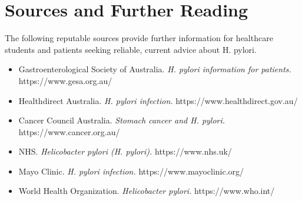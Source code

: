 \section*{Sources and Further Reading}
The following reputable sources provide further information for healthcare students and patients seeking reliable, current advice about H. pylori.

\begin{itemize}
    \item Gastroenterological Society of Australia. \textit{H. pylori information for patients.} https://www.gesa.org.au/
    \item Healthdirect Australia. \textit{H. pylori infection.} https://www.healthdirect.gov.au/
    \item Cancer Council Australia. \textit{Stomach cancer and H. pylori.} https://www.cancer.org.au/
    \item NHS. \textit{Helicobacter pylori (H. pylori).} https://www.nhs.uk/
    \item Mayo Clinic. \textit{H. pylori infection.} https://www.mayoclinic.org/
    \item World Health Organization. \textit{Helicobacter pylori.} https://www.who.int/
\end{itemize}
